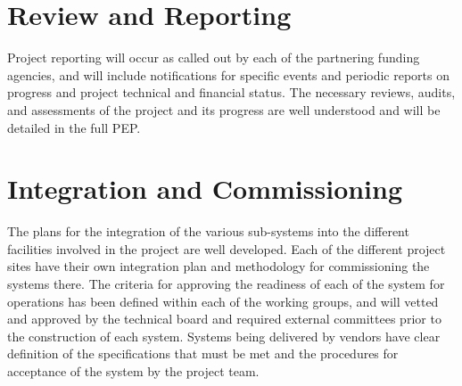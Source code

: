 

\section{Review and Reporting}

Project reporting will occur as called out by each of the partnering funding agencies, and will include notifications for specific events and periodic reports on progress and project technical and financial status.  The necessary reviews, audits, and assessments of the project and its progress are well understood and will be detailed in the full PEP.




\section{Integration and Commissioning}

The plans for the integration of the various sub-systems into the different facilities involved in the project are well developed.  Each of the different project sites have their own integration plan and methodology for commissioning the systems there.  The criteria for approving the readiness of each of the system for operations has been defined within each of the working groups, and will vetted and approved by the technical board and required external committees prior to the construction of each system.  Systems being delivered by vendors have clear definition of the specifications that must be met and the procedures for acceptance of the system by the project team.


